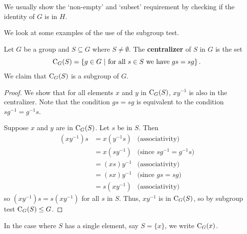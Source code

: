 \begin{remark}
We usually show the `non-empty' and `subset' requirement by checking if the identity of $G$ is in $H$.
\end{remark}

We look at some examples of the use of the subgroup test.
\begin{example}\label{example-centralizer-of-a-subset}
    Let $G$ be a group and $S \subseteq G$ where $S \neq \emptyset$. The \textbf{centralizer} of $S$ in $G$ is the set
    \[
        \C{G}{S} = \left\{g \in G \ | \ \text{for all } s \in S \text{ we have } gs = sg\right\}.
    \]
    We claim that $\mathrm{C}_{G}(S)$ is a subgroup of $G$.
    \begin{proof}
        We show that for all elements $x$ and $y$ in $\mathrm{C}_{G}(S)$, $xy^{-1}$ is also in the centralizer. Note that the condition $gs = sg$ is equivalent to the condition $sg^{-1} = g^{-1}s$.

        Suppose $x$ and $y$ are in $\mathrm{C}_{G}(S)$. Let $s$ be in $S$. Then
        \begin{align*}
            (xy^{-1})s &= x(y^{-1}s) & \text{(associativity)}\\
            &= x(sy^{-1}) & \text{(since } sg^{-1} = g^{-1}s)\\
            &= (xs)y^{-1} & \text{(associativity)}\\
            &= (sx)y^{-1} & \text{(since } gs = sg)\\
            &= s(xy^{-1}) & \text{(associativity)}
        \end{align*}
        so $(xy^{-1})s = s(xy^{-1})$ for all $s$ in $S$. Thus, $xy^{-1}$ is in $\mathrm{C}_{G}(S)$, so by subgroup test $\mathrm{C}_{G}(S) \leq G$.
    \end{proof}
\end{example}
\begin{remark}
    In the case where $S$ has a single element, say $S = \{x\}$, we write $\mathrm{C}_{G}(x)$.
\end{remark}

